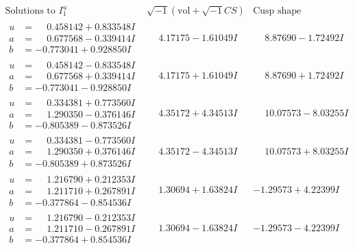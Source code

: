 \documentclass[1p]{elsarticle_modified}
\theoremstyle{definition}
\newcommand{\I}{\sqrt{-1}}
\begin{document}
$$\begin{array}{c|c|c}  
\text{Solutions to }I^u_{1}& \I (\text{vol} + \sqrt{-1}CS) & \text{Cusp shape}\\
 \hline 
\begin{aligned}
u &= \phantom{-}0.458142 + 0.833548 I \\
a &= \phantom{-}0.677568 - 0.339414 I \\
b &= -0.773041 + 0.928850 I\end{aligned}
 & \phantom{-}4.17175 - 1.61049 I & \phantom{-}8.87690 - 1.72492 I \\ \hline\begin{aligned}
u &= \phantom{-}0.458142 - 0.833548 I \\
a &= \phantom{-}0.677568 + 0.339414 I \\
b &= -0.773041 - 0.928850 I\end{aligned}
 & \phantom{-}4.17175 + 1.61049 I & \phantom{-}8.87690 + 1.72492 I \\ \hline\begin{aligned}
u &= \phantom{-}0.334381 + 0.773560 I \\
a &= \phantom{-}1.290350 - 0.376146 I \\
b &= -0.805389 - 0.873526 I\end{aligned}
 & \phantom{-}4.35172 + 4.34513 I & \phantom{-}10.07573 - 8.03255 I \\ \hline\begin{aligned}
u &= \phantom{-}0.334381 - 0.773560 I \\
a &= \phantom{-}1.290350 + 0.376146 I \\
b &= -0.805389 + 0.873526 I\end{aligned}
 & \phantom{-}4.35172 - 4.34513 I & \phantom{-}10.07573 + 8.03255 I \\ \hline\begin{aligned}
u &= \phantom{-}1.216790 + 0.212353 I \\
a &= \phantom{-}1.211710 + 0.267891 I \\
b &= -0.377864 - 0.854536 I\end{aligned}
 & \phantom{-}1.30694 + 1.63824 I & -1.29573 + 4.22399 I \\ \hline\begin{aligned}
u &= \phantom{-}1.216790 - 0.212353 I \\
a &= \phantom{-}1.211710 - 0.267891 I \\
b &= -0.377864 + 0.854536 I\end{aligned}
 & \phantom{-}1.30694 - 1.63824 I & -1.29573 - 4.22399 I \\ \hline\begin{aligned}

\end{aligned}
\end{array}$$
\end{document}
